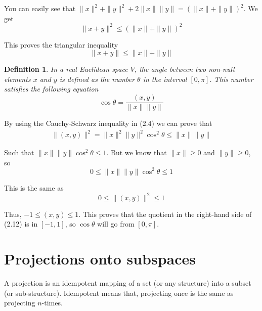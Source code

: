 \documentclass{book}
\newtheorem{definition}{Definition}[section]
\begin{document}
You can easily see that $\|x\|^{2} + \|y\|^{2} + 2\|x\|\|y\| =
    (\|x\|+\|y\|)^{2}$. We get
\begin{equation}
    \|x+y\|^{2} \leq (\|x\|+\|y\|)^{2}
\end{equation}

This proves the triangular inequality
\begin{equation*}
    \|x+y\| \leq \|x\|+\|y\|
\end{equation*}

\begin{definition}
    In a real Euclidean space $V$, the angle between two non-null elements $x$ and $y$ is defined as the number $\theta$
    in the interval $\left[0,\pi\right]$. This number satisfies the following equation
    \begin{equation}
        \cos\theta = \dfrac{\left(x,y\right)}{\|x\|\|y\|}
    \end{equation}
\end{definition}

By using the Cauchy-Schwarz inequality in (2.4) we can prove that
\begin{equation*}
    \begin{split}
        \|(x,y)\|^{2} = \|x\|^{2}\|y\|^{2}\cos^{2}\theta \leq \|x\|\|y\|
    \end{split}
\end{equation*}

Such that $\|x\|\|y\|\cos^{2}\theta \leq 1$. But we know that $\|x\|\geq 0$ and
$\|y\|\geq 0$, so
\begin{equation*}
    0 \leq \|x\|\|y\|\cos^{2}\theta \leq 1
\end{equation*}

This is the same as
\begin{equation*}
    0 \leq \|(x,y)\|^{2} \leq 1
\end{equation*}

Thus, $-1 \leq (x,y) \leq 1$. This proves that the quotient in the right-hand
side of (2.12) is in $[-1,1]$, so $\cos\theta$ will go from $[0,\pi]$.

\chapter{Projections onto subspaces}

A projection is an idempotent mapping of a set (or any structure) into a subset
(or sub-structure). Idempotent means that, projecting once is the same as
projecting $n$-times.
\end{document}
